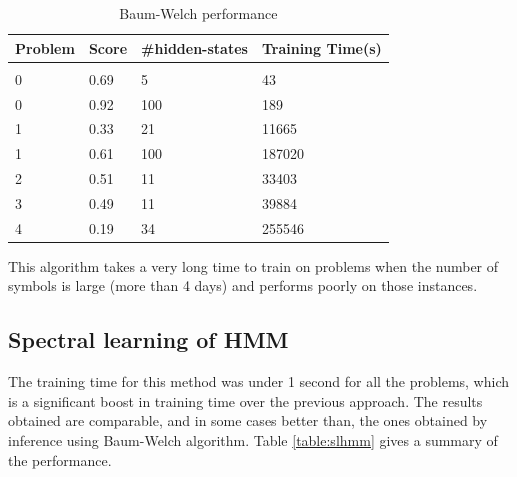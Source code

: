 \documentclass[letterpaper]{article}
\begin{document}
\begin{table}[h]
	\caption{Baum-Welch performance}
	\label{table:bw}
	\begin{center}
		\begin{tabular}{llll}
			\multicolumn{1}{c}{\bf Problem} & \multicolumn{1}{c}{\bf Score} & \multicolumn{1}{c}{\bf \#hidden-states} & \multicolumn{1}{c}{\bf Training Time(s)} \\
			\hline \\
			0                               & 0.69                          & 5                                       & 43                                       \\
			0                               & 0.92                          & 100                                     & 189                                      \\
			1                               & 0.33                          & 21                                      & 11665                                    \\
			1                               & 0.61                          & 100                                     & 187020                                   \\
			2                               & 0.51                          & 11                                      & 33403                                    \\
			3                               & 0.49                          & 11                                      & 39884                                    \\
			4                               & 0.19                          & 34                                      & 255546                                   \\
		\end{tabular}
	\end{center}
\end{table}

This algorithm takes a very long time to train on problems when the number of symbols is large (more than 4 days) and performs poorly on those instances.

\subsection{Spectral learning of HMM}
The training time for this method was under 1 second for all the problems, which is a significant boost in training time over the previous approach. The results obtained are comparable, and in some cases better than, the ones obtained by inference using Baum-Welch algorithm. Table \ref{table:slhmm} gives a summary of the performance.
\end{document}
